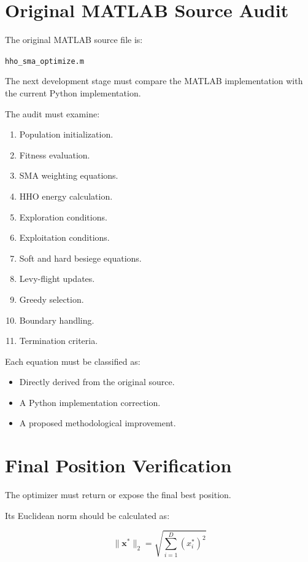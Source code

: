 \documentclass[12pt,a4paper]{report}
\begin{document}
\section{Original MATLAB Source Audit}

The original MATLAB source file is:

\begin{center}
\texttt{hho\_sma\_optimize.m}
\end{center}

The next development stage must compare the MATLAB
implementation with the current Python implementation.

The audit must examine:

\begin{enumerate}
    \item Population initialization.
    \item Fitness evaluation.
    \item SMA weighting equations.
    \item HHO energy calculation.
    \item Exploration conditions.
    \item Exploitation conditions.
    \item Soft and hard besiege equations.
    \item Levy-flight updates.
    \item Greedy selection.
    \item Boundary handling.
    \item Termination criteria.
\end{enumerate}

Each equation must be classified as:

\begin{itemize}
    \item Directly derived from the original source.
    \item A Python implementation correction.
    \item A proposed methodological improvement.
\end{itemize}

\section{Final Position Verification}

The optimizer must return or expose the final
best position.

Its Euclidean norm should be calculated as:

\begin{equation}
\|\mathbf{x}^{*}\|_2 =
\sqrt{\sum_{i=1}^{D}(x_i^{*})^2}
\end{equation}
\end{document}
